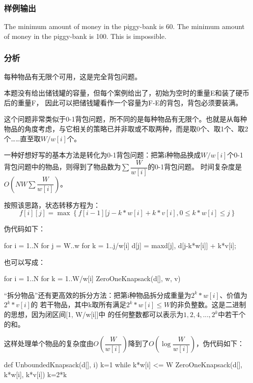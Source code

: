 \subsubsection{样例输出}
\begin{Code}
The minimum amount of money in the piggy-bank is 60.
The minimum amount of money in the piggy-bank is 100.
This is impossible.
\end{Code}

\subsubsection{分析}
每种物品有无限个可用，这是完全背包问题。

本题没有给出储钱罐的容量，但每个案例给出了，初始为空时的重量E和装了硬币后的重量F，
因此可以把储钱罐看作一个容量为F-E的背包，背包必须要装满。

这个问题非常类似于0-1背包问题，所不同的是每种物品有无限个。也就是从每种
物品的角度考虑，与它相关的策略已并非取或不取两种，而是取0个、取1个、取2
个……直至取$W/w[i]$个。

一种好想好写的基本方法是转化为0-1背包问题：把第i种物品换成$W/w[i]$个0-1
背包问题中的物品，则得到了物品数为$\sum \dfrac{W}{w[i]}$的0-1背包问题。
时间复杂度是$O(NW\sum \dfrac{W}{w[i]})$。

按照该思路，状态转移方程为：
$$f[i][j]=\max\left\{f[i-1][j-k*w[i]+k*v[i], 0 \leq k*w[i] \leq j\right\}$$

伪代码如下：
\begin{Code}
for i = 1..N
    for j = W..w
        for k = 1..j/w[i]
            d[j] = max{d[j], d[j-k*w[i]] + k*v[i]};
\end{Code}

也可以写成：
\begin{Code}
for i = 1..N
    for k = 1..W/w[i]
        ZeroOneKnapsack(d[], w, v)
\end{Code}

“拆分物品”还有更高效的拆分方法：把第i种物品拆分成重量为$2^k*w[i]$、价值为$2^k*v[i]$的
若干物品，其中k取所有满足$2^k*w[i] \leq W$的非负整数。这是二进制的思想，因为闭区间[1, W/w[i]]中
的任何整数都可以表示为$1, 2, 4, ..., 2^k$中若干个的和。

这样处理单个物品的复杂度由$O\left(\dfrac{W}{w[i]}\right)$降到了$O\left(\log \dfrac{W}{w[i]}\right)$，伪代码如下：
\begin{Code}
def UnboundedKnapsack(d[], i)
    k=1
    while k*w[i] <= W
        ZeroOneKnapsack(d[], k*w[i], k*v[i])
        k=2*k
\end{Code}

